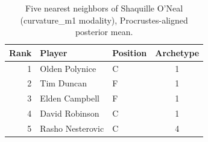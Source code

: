 \begin{table}[htbp]
  \centering\small
  \begin{tabular}{rllc}
    \toprule
    Rank & Player & Position & Archetype \\
    \midrule
    1 & Olden Polynice & C & 1 \\
    2 & Tim Duncan & F & 1 \\
    3 & Elden Campbell & F & 1 \\
    4 & David Robinson & C & 1 \\
    5 & Rasho Nesterovic & C & 4 \\
    \bottomrule
  \end{tabular}
  \caption{Five nearest neighbors of Shaquille O'Neal (curvature_m1 modality), Procrustes-aligned posterior mean.}
  \label{tab:Shaquille_O_Neal_neighbors_curvature_m1}
\end{table}

